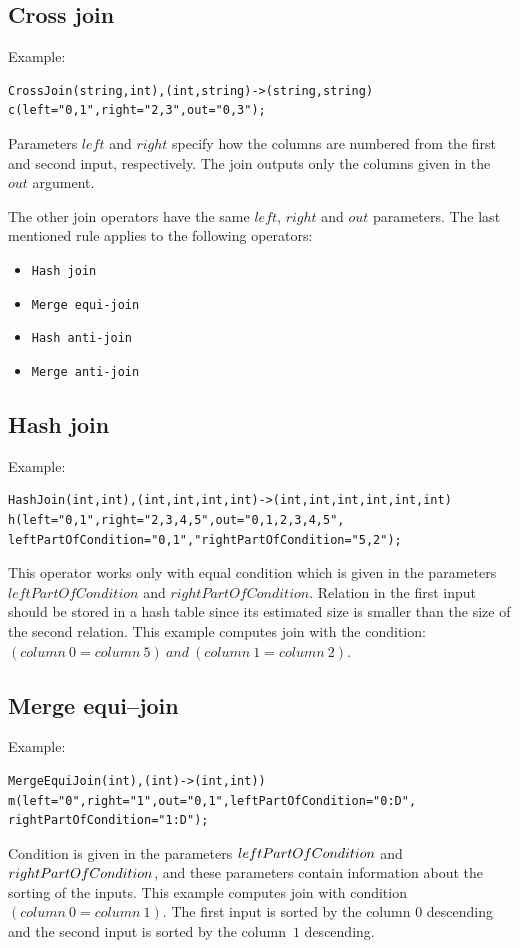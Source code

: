 \subsection{Cross join}
Example:
\begin{lstlisting} 
CrossJoin(string,int),(int,string)->(string,string)
c(left="0,1",right="2,3",out="0,3");
\end{lstlisting}
Parameters $left$ and $right$ specify how the columns are numbered from the first and second input, respectively. The join outputs only the columns given in the $out$ argument. 

The other join operators have the same $left$, $right$ and $out$ parameters. The last mentioned rule applies to the following operators:
\begin{itemize}
\item \texttt{Hash join}
\item \texttt{Merge equi-join}
\item \texttt{Hash anti-join}
\item \texttt{Merge anti-join}
\end{itemize} 

\subsection{Hash join}
Example:
\begin{lstlisting}
HashJoin(int,int),(int,int,int,int)->(int,int,int,int,int,int)
h(left="0,1",right="2,3,4,5",out="0,1,2,3,4,5",
leftPartOfCondition="0,1","rightPartOfCondition="5,2"); 
\end{lstlisting}
This operator works only with equal condition which is given in the parameters $leftPartOfCondition$ and $rightPartOfCondition$. Relation in the first input should be stored in a hash table since its estimated size is smaller than the size of the second relation. This example computes join with the condition:\\
 $(column~0=column~5)~and~(column~1=column~2)$.

\subsection{Merge equi--join}
Example:
\begin{lstlisting}
MergeEquiJoin(int),(int)->(int,int))
m(left="0",right="1",out="0,1",leftPartOfCondition="0:D",
rightPartOfCondition="1:D");
\end{lstlisting}
Condition is given in the parameters $left\-Part\-Of\-Con\-di\-tion$ and $right\-Part\-Of\-Con\-di\-tion$, and these parameters contain information about the sorting of the inputs. This example computes join with condition $(column~0 = column~1)$. The first input is sorted by the column $0$ descending and the second input is sorted by the column~$1$ descending.

